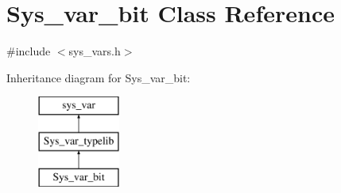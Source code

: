 \hypertarget{classSys__var__bit}{}\section{Sys\+\_\+var\+\_\+bit Class Reference}
\label{classSys__var__bit}


{\ttfamily \#include $<$sys\+\_\+vars.\+h$>$}

Inheritance diagram for Sys\+\_\+var\+\_\+bit\+:\begin{figure}[H]
\begin{center}
\leavevmode
\includegraphics[height=3.000000cm]{classSys__var__bit}
\end{center}
\end{figure}
